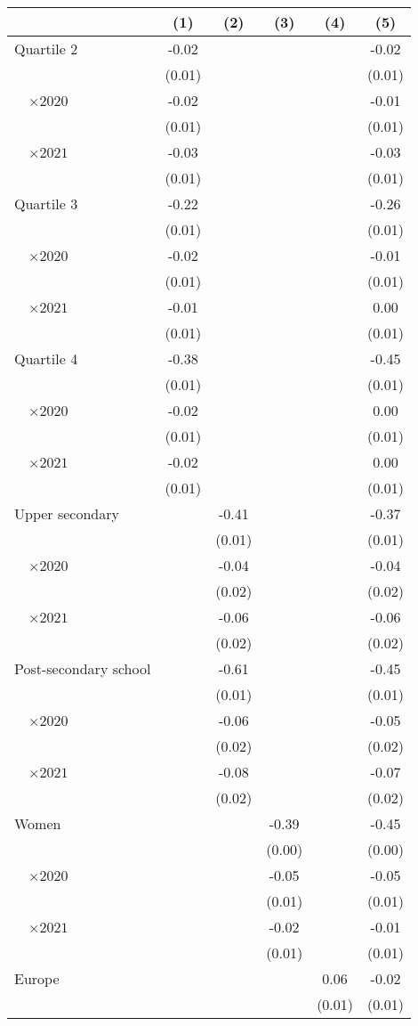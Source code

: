 
\begin{tabular}{@{}l*{5}{S[table-format={-}2.2{\tnote{***}}]}@{}}
\toprule
{} & {(1)} & {(2)} & {(3)} & {(4)} & {(5)}\tabularnewline%
\midrule
Quartile 2 & -0.02\tnote{***} &  &  &  & -0.02\tnote{*}\tabularnewline%
 & (0.01) &  &  &  & \vphantom{8} (0.01)\tabularnewline%
~~\(\times 2020\) & -0.02 &  &  &  & \vphantom{1} -0.01\tabularnewline%
 & (0.01) &  &  &  & \vphantom{7} (0.01)\tabularnewline%
~~\(\times 2021\) & -0.03\tnote{**} &  &  &  & -0.03\tnote{*}\tabularnewline%
 & (0.01) &  &  &  & \vphantom{6} (0.01)\tabularnewline%
Quartile 3 & -0.22\tnote{***} &  &  &  & -0.26\tnote{***}\tabularnewline%
 & (0.01) &  &  &  & \vphantom{5} (0.01)\tabularnewline%
~~\(\times 2020\) & -0.02 &  &  &  & -0.01\tabularnewline%
 & (0.01) &  &  &  & \vphantom{4} (0.01)\tabularnewline%
~~\(\times 2021\) & -0.01 &  &  &  & 0.00\tabularnewline%
 & (0.01) &  &  &  & \vphantom{3} (0.01)\tabularnewline%
Quartile 4 & -0.38\tnote{***} &  &  &  & -0.45\tnote{***}\tabularnewline%
 & (0.01) &  &  &  & \vphantom{2} (0.01)\tabularnewline%
~~\(\times 2020\) & -0.02 &  &  &  & 0.00\tabularnewline%
 & (0.01) &  &  &  & \vphantom{1} (0.01)\tabularnewline%
~~\(\times 2021\) & -0.02\tnote{\dagger} &  &  &  & 0.00\tabularnewline%
 & (0.01) &  &  &  & (0.01)\tabularnewline%
Upper secondary &  & -0.41\tnote{***} &  &  & -0.37\tnote{***}\tabularnewline%
 &  & (0.01) &  &  & \vphantom{1} (0.01)\tabularnewline%
~~\(\times 2020\) &  & -0.04\tnote{*} &  &  & -0.04\tnote{\dagger}\tabularnewline%
 &  & (0.02) &  &  & \vphantom{3} (0.02)\tabularnewline%
~~\(\times 2021\) &  & -0.06\tnote{***} &  &  & -0.06\tnote{***}\tabularnewline%
 &  & (0.02) &  &  & \vphantom{2} (0.02)\tabularnewline%
Post-secondary school &  & -0.61\tnote{***} &  &  & -0.45\tnote{***}\tabularnewline%
 &  & (0.01) &  &  & (0.01)\tabularnewline%
~~\(\times 2020\) &  & -0.06\tnote{***} &  &  & -0.05\tnote{**}\tabularnewline%
 &  & (0.02) &  &  & \vphantom{1} (0.02)\tabularnewline%
~~\(\times 2021\) &  & -0.08\tnote{***} &  &  & -0.07\tnote{***}\tabularnewline%
 &  & (0.02) &  &  & (0.02)\tabularnewline%
Women &  &  & -0.39\tnote{***} &  & -0.45\tnote{***}\tabularnewline%
 &  &  & (0.00) &  & (0.00)\tabularnewline%
~~\(\times 2020\) &  &  & -0.05\tnote{***} &  & -0.05\tnote{***}\tabularnewline%
 &  &  & (0.01) &  & \vphantom{1} (0.01)\tabularnewline%
~~\(\times 2021\) &  &  & -0.02\tnote{\dagger} &  & -0.01\tabularnewline%
 &  &  & (0.01) &  & (0.01)\tabularnewline%
Europe &  &  &  & 0.06\tnote{***} & -0.02\tnote{**}\tabularnewline%
 &  &  &  & (0.01) & \vphantom{2} (0.01)\tabularnewline%

\end{tabular}

